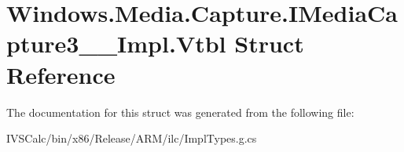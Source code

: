 \hypertarget{struct_windows_1_1_media_1_1_capture_1_1_i_media_capture3_____impl_1_1_vtbl}{}\section{Windows.\+Media.\+Capture.\+I\+Media\+Capture3\+\_\+\+\_\+\+Impl.\+Vtbl Struct Reference}
\label{struct_windows_1_1_media_1_1_capture_1_1_i_media_capture3_____impl_1_1_vtbl}


The documentation for this struct was generated from the following file\+:\begin{DoxyCompactItemize}
\item 
I\+V\+S\+Calc/bin/x86/\+Release/\+A\+R\+M/ilc/Impl\+Types.\+g.\+cs\end{DoxyCompactItemize}
